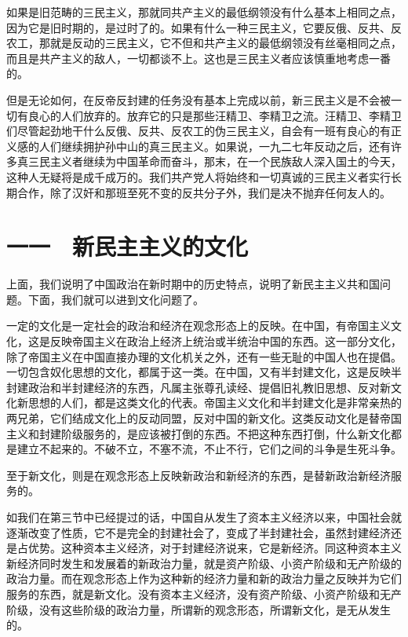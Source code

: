 如果是旧范畴的三民主义，那就同共产主义的最低纲领没有什么基本上相同之点，因为它是旧时期的，是过时了的。如果有什么一种三民主义，它要反俄、反共、反农工，那就是反动的三民主义，它不但和共产主义的最低纲领没有丝毫相同之点，而且是共产主义的敌人，一切都谈不上。这也是三民主义者应该慎重地考虑一番的。

但是无论如何，在反帝反封建的任务没有基本上完成以前，新三民主义是不会被一切有良心的人们放弃的。放弃它的只是那些汪精卫、李精卫之流。汪精卫、李精卫们尽管起劲地干什么反俄、反共、反农工的伪三民主义，自会有一班有良心的有正义感的人们继续拥护孙中山的真三民主义。如果说，一九二七年反动之后，还有许多真三民主义者继续为中国革命而奋斗，那末，在一个民族敌人深入国土的今天，这种人无疑将是成千成万的。我们共产党人将始终和一切真诚的三民主义者实行长期合作，除了汉奸和那班至死不变的反共分子外，我们是决不抛弃任何友人的。

\section{一一　新民主主义的文化}

上面，我们说明了中国政治在新时期中的历史特点，说明了新民主主义共和国问题。下面，我们就可以进到文化问题了。

一定的文化是一定社会的政治和经济在观念形态上的反映。在中国，有帝国主义文化，这是反映帝国主义在政治上经济上统治或半统治中国的东西。这一部分文化，除了帝国主义在中国直接办理的文化机关之外，还有一些无耻的中国人也在提倡。一切包含奴化思想的文化，都属于这一类。在中国，又有半封建文化，这是反映半封建政治和半封建经济的东西，凡属主张尊孔读经、提倡旧礼教旧思想、反对新文化新思想的人们，都是这类文化的代表。帝国主义文化和半封建文化是非常亲热的两兄弟，它们结成文化上的反动同盟，反对中国的新文化。这类反动文化是替帝国主义和封建阶级服务的，是应该被打倒的东西。不把这种东西打倒，什么新文化都是建立不起来的。不破不立，不塞不流，不止不行，它们之间的斗争是生死斗争。

至于新文化，则是在观念形态上反映新政治和新经济的东西，是替新政治新经济服务的。

如我们在第三节中已经提过的话，中国自从发生了资本主义经济以来，中国社会就逐渐改变了性质，它不是完全的封建社会了，变成了半封建社会，虽然封建经济还是占优势。这种资本主义经济，对于封建经济说来，它是新经济。同这种资本主义新经济同时发生和发展着的新政治力量，就是资产阶级、小资产阶级和无产阶级的政治力量。而在观念形态上作为这种新的经济力量和新的政治力量之反映并为它们服务的东西，就是新文化。没有资本主义经济，没有资产阶级、小资产阶级和无产阶级，没有这些阶级的政治力量，所谓新的观念形态，所谓新文化，是无从发生的。

